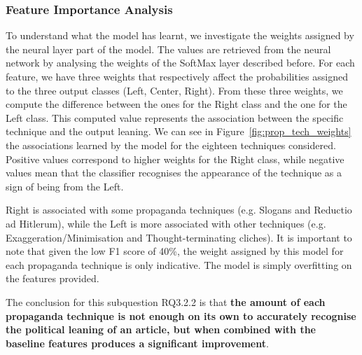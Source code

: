 \subsubsection{Feature Importance Analysis}
To understand what the model has learnt, we investigate the weights assigned by the neural layer part of the model.
The values are retrieved from the neural network by analysing the weights of the SoftMax layer described before.
For each feature, we have three weights that respectively affect the probabilities assigned to the three output classes (Left, Center, Right).
From these three weights, we compute the difference between the ones for the Right class and the one for the Left class. This computed value represents the association between the specific technique and the output leaning. 
We can see in Figure~\ref{fig:prop_tech_weights} the associations learned by the model for the eighteen techniques considered.
Positive values correspond to higher weights for the Right class, while negative values mean that the classifier recognises the appearance of the technique as a sign of being from the Left.

Right is associated with some propaganda techniques (e.g. Slogans and Reductio ad Hitlerum), while the Left is more associated with other techniques (e.g. Exaggeration/Minimisation and Thought-terminating cliches).
It is important to note that given the low F1 score of 40\%, the weight assigned by this model for each propaganda technique is only indicative. %
The model is simply overfitting on the features provided.




The conclusion for this subquestion RQ3.2.2 is that \textbf{the amount of each propaganda technique is not enough on its own to accurately recognise the political leaning of an article, but when combined with the baseline features produces a significant improvement}.


